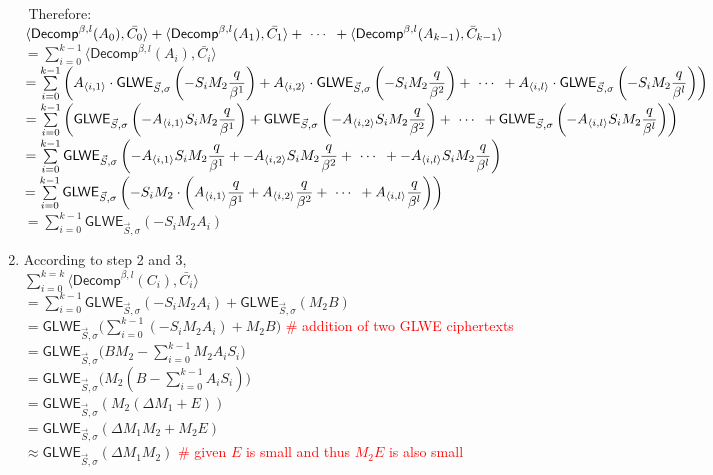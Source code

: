 \begin{myproof}
\begin{enumerate}
$ $
Therefore: \\
$\langle \textsf{Decomp}^{\beta, l}(A_0), \bar{C_0} \rangle + \langle \textsf{Decomp}^{\beta, l}(A_1), \bar{C_1} \rangle + \text{ } \text{$\cdots$} \text{ } + \langle \textsf{Decomp}^{\beta, l}(A_{k-1}), \bar{C}_{k-1} \rangle$ \\
$= \sum\limits_{i=0}^{k-1}\langle \textsf{Decomp}^{\beta, l}(A_i), \bar{C_i} \rangle$ \\
$= \sum\limits_{i=0}^{k-1}\left(A_{\langle i, 1\rangle} \cdot \textsf{GLWE}_{\vec{S}, \sigma}\left(-S_iM_2\dfrac{q}{\beta^1}\right) + A_{\langle i, 2\rangle} \cdot \textsf{GLWE}_{\vec{S}, \sigma}\left(-S_iM_2\dfrac{q}{\beta^2}\right) + \text{ } \text{$\cdots$} \text{ } + A_{\langle i, l\rangle} \cdot \textsf{GLWE}_{\vec{S}, \sigma}\left(-S_iM_2\dfrac{q}{\beta^l}\right)\right)$ \\
$= \sum\limits_{i=0}^{k-1}\left(\textsf{GLWE}_{\vec{S}, \sigma}\left(-A_{\langle i, 1\rangle}S_iM_2\dfrac{q}{\beta^1}\right) + \textsf{GLWE}_{\vec{S}, \sigma}\left(-A_{\langle i, 2\rangle}S_iM_2\dfrac{q}{\beta^2}\right) + \text{ } \text{$\cdots$} \text{ } + \textsf{GLWE}_{\vec{S}, \sigma}\left(-A_{\langle i, l\rangle}S_iM_2\dfrac{q}{\beta^l}\right)\right)$ \\
$= \sum\limits_{i=0}^{k-1}\textsf{GLWE}_{\vec{S}, \sigma}\left(-A_{\langle i, 1\rangle}S_iM_2\dfrac{q}{\beta^1} + -A_{\langle i, 2\rangle}S_iM_2\dfrac{q}{\beta^2} + \text{ } \text{$\cdots$} \text{ } + -A_{\langle i, l\rangle}S_iM_2\dfrac{q}{\beta^l}\right)$ \\
$= \sum\limits_{i=0}^{k-1}\textsf{GLWE}_{\vec{S}, \sigma}\left(-S_iM_2 \cdot \left(A_{\langle i, 1\rangle}\dfrac{q}{\beta^1} + A_{\langle i, 2\rangle}\dfrac{q}{\beta^2} + \text{ } \text{$\cdots$} \text{ } + A_{\langle i, l\rangle}\dfrac{q}{\beta^l}\right)\right)$ \\
$= \sum\limits_{i=0}^{k-1}\textsf{GLWE}_{\vec{S}, \sigma}(-S_iM_2A_i)$
\item According to step 2 and 3, \\
$\sum\limits_{i=0}^{k=k}\langle \textsf{Decomp}^{\beta, l}(C_i), \bar{C_i} \rangle$ \\
$= \sum\limits_{i=0}^{k-1}\textsf{GLWE}_{\vec{S}, \sigma}(-S_iM_2A_i) + \textsf{GLWE}_{\vec{S}, \sigma} (M_{2}B)$ \\ 
$= \textsf{GLWE}_{\vec{S}, \sigma}\Big(\sum\limits_{i=0}^{k-1}(-S_iM_2A_i) + M_{2}B\Big)$ \textcolor{red}{\# addition of two GLWE ciphertexts} \\ 
$= \textsf{GLWE}_{\vec{S}, \sigma}\Big(BM_2 - \sum\limits_{i=0}^{k-1}M_2A_iS_i\Big)$  \\ 
$= \textsf{GLWE}_{\vec{S}, \sigma}\Big(M_2(B - \sum\limits_{i=0}^{k-1}A_iS_i)\Big)$\\
$= \textsf{GLWE}_{\vec{S}, \sigma}(M_2(\Delta M_1 + E))$ \\
$= \textsf{GLWE}_{\vec{S}, \sigma}(\Delta M_1M_2 + M_2E)$ \\
$\approx \textsf{GLWE}_{\vec{S}, \sigma}(\Delta M_1M_2)$ \textcolor{red}{\# given $E$ is small and thus $M_2E$ is also small}
\end{enumerate}

\end{myproof}

